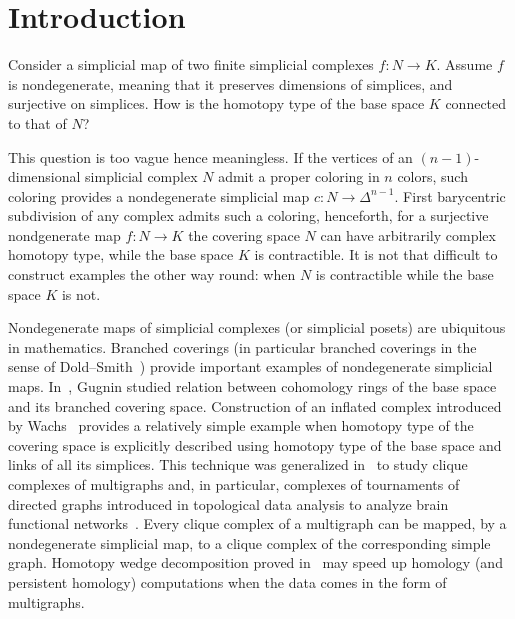 \documentclass[english,12pt,oneside]{amsproc}
\numberwithin{equation}{section}
\theoremstyle{plain}
\theoremstyle{definition}
\theoremstyle{remark}
\begin{document}
\maketitle

\section{Introduction}\label{secMotivation}

Consider a simplicial map of two finite simplicial complexes $f\colon N\to K$. Assume $f$ is nondegenerate, meaning that it preserves dimensions of simplices, and surjective on simplices. How is the homotopy type of the base space $K$ connected to that of $N$?

This question is too vague hence meaningless. If the vertices of an $(n-1)$-dimensional simplicial complex $N$ admit a proper coloring in $n$ colors, such coloring provides a nondegenerate simplicial map $c\colon N\to \Delta^{n-1}$. First barycentric subdivision of any complex admits such a coloring, henceforth, for a surjective nondgenerate map $f\colon N\to K$ the covering space $N$ can have arbitrarily complex homotopy type, while the base space $K$ is contractible. It is not that difficult to construct examples the other way round: when $N$ is contractible while the base space $K$ is not.

Nondegenerate maps of simplicial complexes (or simplicial posets) are ubiquitous in mathematics. Branched coverings (in particular branched coverings in the sense of Dold--Smith~\cite{BuchVesnin}) provide important examples of nondegenerate simplicial maps. In~\cite{GugninFr1,GugninFr2,GugninBound}, Gugnin studied relation between cohomology rings of the base space and its branched covering space. Construction of an inflated complex introduced by Wachs~\cite{Wachs} provides a relatively simple example when homotopy type of the covering space is explicitly described using homotopy type of the base space and links of all its simplices. This technique was generalized in~\cite{AyzRukh} to study clique complexes of multigraphs and, in particular, complexes of tournaments of directed graphs introduced in topological data analysis to analyze brain functional networks~\cite{Govc, GLS}. Every clique complex of a multigraph can be mapped, by a nondegenerate simplicial map, to a clique complex of the corresponding simple graph. Homotopy wedge decomposition proved in~\cite{AyzRukh} may speed up homology (and persistent homology) computations when the data comes in the form of multigraphs.
\end{document}
